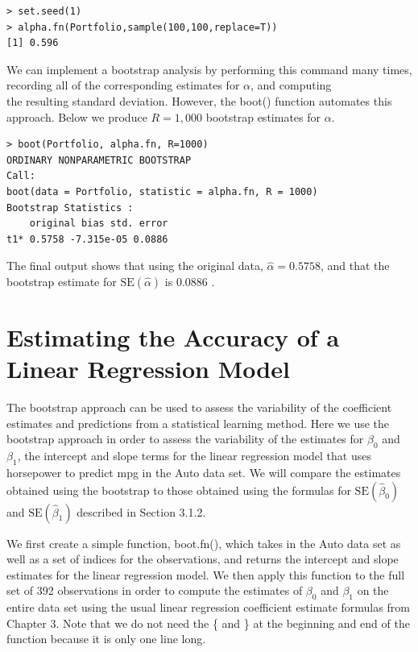 \documentclass[10pt]{article}
\begin{document}
\begin{verbatim}
> set.seed(1)
> alpha.fn(Portfolio,sample(100,100,replace=T))
[1] 0.596
\end{verbatim}

We can implement a bootstrap analysis by performing this command many times, recording all of the corresponding estimates for $\alpha$, and computing\\
the resulting standard deviation. However, the boot() function automates this approach. Below we produce $R=1,000$ bootstrap estimates for $\alpha$.

\begin{verbatim}
> boot(Portfolio, alpha.fn, R=1000)
ORDINARY NONPARAMETRIC BOOTSTRAP
Call:
boot(data = Portfolio, statistic = alpha.fn, R = 1000)
Bootstrap Statistics :
    original bias std. error
t1* 0.5758 -7.315e-05 0.0886
\end{verbatim}

The final output shows that using the original data, $\hat{\alpha}=0.5758$, and that the bootstrap estimate for $\mathrm{SE}(\hat{\alpha})$ is 0.0886 .

\section*{Estimating the Accuracy of a Linear Regression Model}
The bootstrap approach can be used to assess the variability of the coefficient estimates and predictions from a statistical learning method. Here we use the bootstrap approach in order to assess the variability of the estimates for $\beta_{0}$ and $\beta_{1}$, the intercept and slope terms for the linear regression model that uses horsepower to predict mpg in the Auto data set. We will compare the estimates obtained using the bootstrap to those obtained using the formulas for $\mathrm{SE}\left(\hat{\beta}_{0}\right)$ and $\mathrm{SE}\left(\hat{\beta}_{1}\right)$ described in Section 3.1.2.

We first create a simple function, boot.fn(), which takes in the Auto data set as well as a set of indices for the observations, and returns the intercept and slope estimates for the linear regression model. We then apply this function to the full set of 392 observations in order to compute the estimates of $\beta_{0}$ and $\beta_{1}$ on the entire data set using the usual linear regression coefficient estimate formulas from Chapter 3. Note that we do not need the \{ and \} at the beginning and end of the function because it is only one line long.
\end{document}
